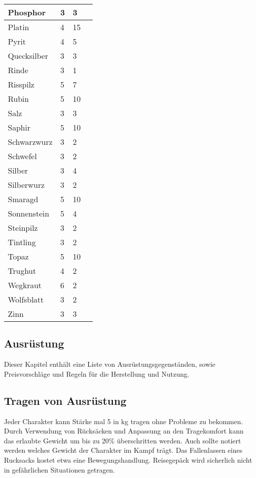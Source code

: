 \documentclass{article}
\begin{document}
\begin{small}
\begin{tabular}{|m{3cm}|m{3cm}|m{4cm}|m{6cm}|}
Phosphor&3&3&\\
\hline
Platin&4&15&\\
\hline
Pyrit&4&5&\\
\hline
Quecksilber&3&3&\\
\hline
Rinde&3&1&\\
\hline
Risspilz&5&7&\\
\hline
Rubin&5&10&\\
\hline
Salz&3&3&\\
\hline
Saphir&5&10&\\
\hline
Schwarzwurz&3&2&\\
\hline
Schwefel&3&2&\\
\hline
Silber&3&4&\\
\hline
Silberwurz&3&2&\\
\hline
Smaragd&5&10&\\
\hline
Sonnenstein&5&4&\\
\hline
Steinpilz&3&2&\\
\hline
Tintling&3&2&\\
\hline
Topaz&5&10&\\
\hline
Trughut&4&2&\\
\hline
Wegkraut&6&2&\\
\hline
Wolfsblatt&3&2&\\
\hline
Zinn&3&3&\\
\hline
\end{tabular}
\end{small}

\begin{center}
\section{Ausrüstung}
\end{center}

Dieser Kapitel enthält eine Liste von Ausrüstungsgegenständen, sowie Preisvorschläge und Regeln für die Herstellung
und Nutzung.

\begin{center}
\subsection{Tragen von Ausrüstung}
\end{center}

Jeder Charakter kann Stärke mal 5 in kg tragen ohne Probleme zu bekommen. Durch Verwendung von Rücksäcken und
Anpassung an den Tragekomfort kann das erlaubte Gewicht um bis zu 20\% überschritten werden. Auch sollte notiert
werden welches Gewicht der Charakter im Kampf trägt. Das Fallenlassen eines Rucksacks kostet etwa eine
Bewegungshandlung. Reisegepäck wird sicherlich nicht in gefährlichen Situationen getragen.
\end{document}
